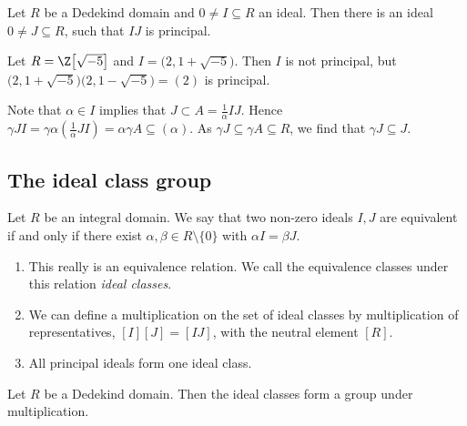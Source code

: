 
\begin{thmn}
	Let \( R \) be a Dedekind domain and \( 0 \neq I \subseteq R \) an ideal.
	Then there is an ideal \( 0 \neq J \subseteq R \), such that \( IJ \) is principal.
\end{thmn}

\begin{exmp*}
	Let \( R = \Z\big[\sqrt{-5}\big] \) and \( I = \big(2, 1+\sqrt{-5}\big) \).
	Then \( I \) is not principal, but \( \big(2, 1+\sqrt{-5}\big)\big(2, 1-\sqrt{-5}\big) = (2) \) is principal.
\end{exmp*}

\begin{obs*}
	Note that \( \alpha \in I \) implies that \( J \subset A = \frac{1}{\alpha}IJ \).
	Hence \( \gamma JI = \gamma\alpha \left( \frac{1}{\alpha} JI \right) = \alpha\gamma A \subseteq (\alpha) \).
	As \( \gamma J \subseteq \gamma A \subseteq R \), we find that \( \gamma J \subseteq J \).
\end{obs*}

\subsection*{The ideal class group}

\begin{defn*}
	Let \( R \) be an integral domain. We say that two non-zero ideals \( I, J \) are equivalent if and only if there exist \( \alpha, \beta \in R\setminus \{0\} \) with \( \alpha I = \beta J \).
\end{defn*}

\begin{rem*}
	\begin{enumerate}
		\item This really is an equivalence relation.
			We call the equivalence classes under this relation \emph{ideal classes}.
		\item We can define a multiplication on the set of ideal classes by multiplication of representatives, \( [I] [J] = [IJ] \), with the neutral element \( [R] \).
		\item All principal ideals form one ideal class.
	\end{enumerate}
\end{rem*}

\begin{cor}
	Let \( R \) be a Dedekind domain.
	Then the ideal classes form a group under multiplication.
\end{cor}

